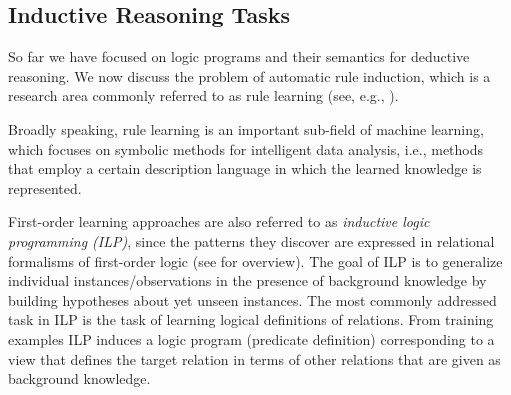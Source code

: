 \subsection{Inductive Reasoning Tasks}
\label{sec:rules_learning_tasks}

So far we have focused on logic programs and their semantics for deductive reasoning. We now discuss the problem of automatic rule induction, which is a research area commonly referred to as rule learning (see, e.g., \cite{DBLP:books/daglib/0021868,DBLP:series/cogtech/FurnkranzGL12}). 

Broadly speaking, rule learning is an important sub-field of machine learning, which focuses on symbolic methods for intelligent data analysis, i.e., methods that employ a certain description language in which the learned knowledge is represented. %

First-order learning approaches are also referred to as %
 \emph{inductive logic programming (ILP)}, since the patterns they discover are expressed in
relational formalisms of first-order logic (see \cite{DBLP:books/daglib/0021868} for overview).
The goal of ILP is to generalize individual instances/observations in the presence of background knowledge by building
hypotheses about yet unseen instances. The most commonly addressed task in ILP is the task
of learning logical definitions of relations. From training examples ILP induces a
logic program (predicate definition) corresponding to a view
that defines the target relation in terms of other relations
that are given as background knowledge. 

